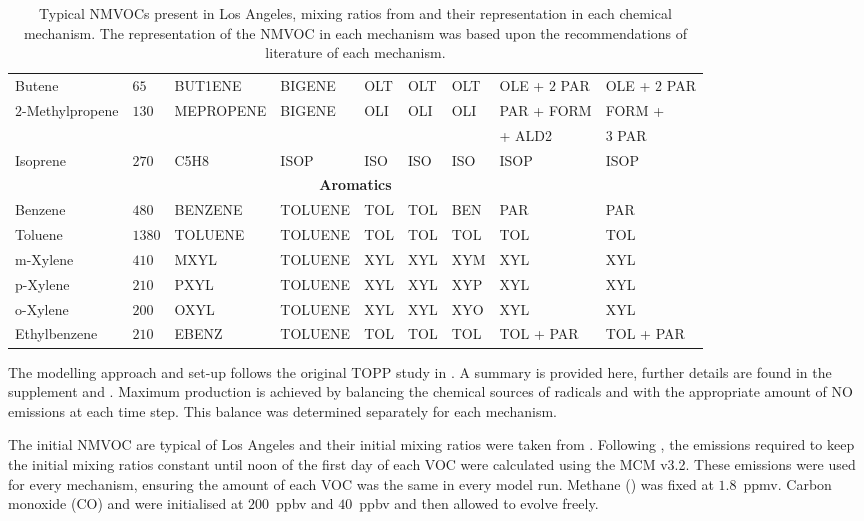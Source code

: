 \begin{sidewaystable}
\begin{tabular}{lllllllll}
        Butene & $65$ & BUT1ENE & BIGENE & OLT & OLT & OLT & OLE + $2$ PAR & OLE + $2$ PAR \\ 
        \multirow{2}{*}{$2$-Methylpropene} & \multirow{2}{*}{$130$} & \multirow{2}{*}{MEPROPENE} & \multirow{2}{*}{BIGENE} & \multirow{2}{*}{OLI} & \multirow{2}{*}{OLI} & \multirow{2}{*}{OLI} & PAR + FORM & FORM + \\ & & & & & & & \hspace{3mm}+ ALD2 & \hspace{3mm}$3$ PAR \\
        Isoprene & $270$ & C5H8 & ISOP & ISO & ISO & ISO & ISOP & ISOP \\ \hline
        \multicolumn{9}{c}{\textbf{Aromatics}} \\ \hline 
        Benzene & $480$ & BENZENE & TOLUENE & TOL & TOL & BEN & PAR & PAR \\
        Toluene & $1380$ & TOLUENE & TOLUENE & TOL & TOL & TOL & TOL & TOL \\
        m-Xylene & $410$ & MXYL & TOLUENE & XYL & XYL & XYM & XYL & XYL \\
        p-Xylene & $210$ & PXYL & TOLUENE & XYL & XYL & XYP & XYL & XYL \\
        o-Xylene & $200$ & OXYL & TOLUENE & XYL & XYL & XYO & XYL & XYL \\
        Ethylbenzene & $210$ & EBENZ & TOLUENE & TOL & TOL & TOL & TOL + PAR & TOL + PAR \\ \hline \hline
    \end{tabular}
    \vspace{1mm}
    \caption{Typical NMVOCs present in Los Angeles, mixing ratios from \citet{Baker:2008} and their representation in each chemical mechanism. The representation of the NMVOC in each mechanism was based upon the recommendations of literature of each mechanism.}
    \vspace{-4mm}
    \label{t:initial_conditions}
\end{sidewaystable}

The modelling approach and set-up follows the original TOPP study in \citet{Butler:2011}.
A summary is provided here, further details are found in the supplement and \citet{Butler:2011}. 
Maximum  production is achieved by balancing the chemical sources of radicals and  with the appropriate amount of NO emissions at each time step.
This balance was determined separately for each mechanism.

The initial NMVOC are typical of Los Angeles and their initial mixing ratios were taken from \citet{Baker:2008}. 
Following \citet{Butler:2011}, the emissions required to keep the initial mixing ratios constant until noon of the first day of each VOC were calculated using the MCM v3.2.
These emissions were used for every mechanism, ensuring the amount of each VOC was the same in every model run.
Methane () was fixed at \mbox{$1.8$ ppmv}. 
Carbon monoxide (CO) and  were initialised at \mbox{$200$ ppbv} and \mbox{$40$ ppbv} and then allowed to evolve freely.

